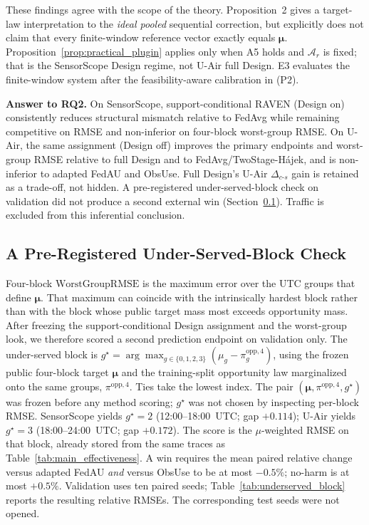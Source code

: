 \documentclass[letterpaper,journal]{IEEEtran}
\begin{document}
These findings agree with the scope of the theory.  Proposition~2 gives
a target-law interpretation to the \emph{ideal pooled} sequential correction,
but explicitly does not claim that every finite-window reference vector exactly
equals $\boldsymbol{\mu}$.  Proposition~\ref{prop:practical_plugin}
applies only when A5 holds and $\mathcal{A}_r$ is fixed; that is the
SensorScope Design regime, not U-Air full Design.  E3 evaluates the
finite-window system after the feasibility-aware calibration in (P2).

\noindent\textbf{Answer to RQ2.}
On SensorScope, support-conditional RAVEN (Design on) consistently reduces structural
mismatch relative to FedAvg while remaining competitive on RMSE and
non-inferior on four-block worst-group RMSE.  On U-Air, the same assignment
(Design off) improves the primary endpoints and worst-group
RMSE relative to full Design and to FedAvg/TwoStage-H\'ajek, and is
non-inferior to adapted FedAU and ObsUse.  Full Design's U-Air
$\Delta_{c\text{-}s}$ gain is retained as a trade-off, not hidden.
A pre-registered under-served-block check on validation did not produce
a second external win (Section~\ref{subsec:eval_underserved}).
Traffic is excluded from this inferential conclusion.

\subsection{A Pre-Registered Under-Served-Block Check}
\label{subsec:eval_underserved}

Four-block $\mathrm{WorstGroupRMSE}$ is the maximum error over the UTC
groups that define $\boldsymbol\mu$.  That maximum can coincide with the
intrinsically hardest block rather than with the block whose public
target mass most exceeds opportunity mass.  After freezing the
support-conditional Design assignment and the worst-group look, we therefore scored a second
prediction endpoint on validation only.  The under-served block is
$g^{\star}=\arg\max_{g\in\{0,1,2,3\}}
(\mu_g-\pi^{\mathrm{opp},4}_g)$,
using the frozen public four-block target $\boldsymbol\mu$ and the
training-split opportunity law marginalized onto the same groups,
$\pi^{\mathrm{opp},4}$.  Ties take the lowest index.  The pair
$(\boldsymbol\mu,\pi^{\mathrm{opp},4},g^{\star})$ was frozen before any
method scoring; $g^{\star}$ was not chosen by inspecting per-block RMSE.
SensorScope yields $g^{\star}=2$ (12:00--18:00~UTC; gap $+0.114$);
U-Air yields $g^{\star}=3$ (18:00--24:00~UTC; gap $+0.172$).  The score
is the $\mu$-weighted RMSE on that block, already stored from the same
traces as Table~\ref{tab:main_effectiveness}.  A win requires the mean
paired relative change versus adapted FedAU \emph{and} versus ObsUse to
be at most $-0.5\%$; no-harm is at most $+0.5\%$.  Validation uses ten
paired seeds; Table~\ref{tab:underserved_block} reports the resulting
relative RMSEs.  The corresponding test seeds were not opened.
\end{document}

